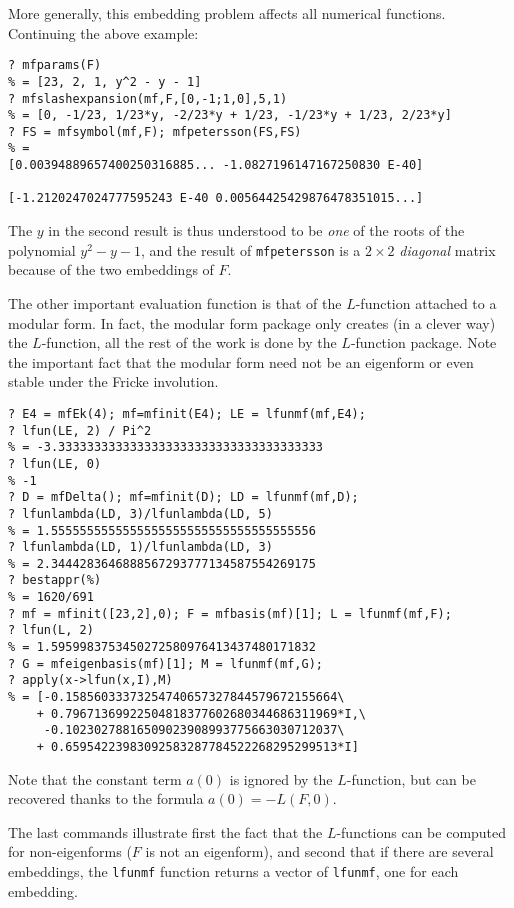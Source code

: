 \documentclass[11pt]{article}
\def\kbd#1{{\tt #1}}
\begin{document}
  More generally, this embedding problem affects all numerical functions.
  Continuing the above example:

\begin{verbatim}
? mfparams(F)
% = [23, 2, 1, y^2 - y - 1]
? mfslashexpansion(mf,F,[0,-1;1,0],5,1)
% = [0, -1/23, 1/23*y, -2/23*y + 1/23, -1/23*y + 1/23, 2/23*y]
? FS = mfsymbol(mf,F); mfpetersson(FS,FS)
% =
[0.00394889657400250316885... -1.0827196147167250830 E-40]

[-1.2120247024777595243 E-40 0.00564425429876478351015...]
\end{verbatim}

  The $y$ in the second result is thus understood to be \emph{one} of
  the roots of the polynomial $y^2-y-1$, and the result of \kbd{mfpetersson}
  is a $2\times 2$ \emph{diagonal} matrix because of the two embeddings of $F$.

  \smallskip

  The other important evaluation function is that of the $L$-function
  attached to a modular form. In fact, the modular form package only
  creates (in a clever way) the $L$-function, all the rest of the work
  is done by the $L$-function package. Note the important fact that
  the modular form need not be an eigenform or even stable under the
  Fricke involution.

\begin{verbatim}
? E4 = mfEk(4); mf=mfinit(E4); LE = lfunmf(mf,E4);
? lfun(LE, 2) / Pi^2
% = -3.3333333333333333333333333333333333333
? lfun(LE, 0)
% -1
? D = mfDelta(); mf=mfinit(D); LD = lfunmf(mf,D);
? lfunlambda(LD, 3)/lfunlambda(LD, 5)
% = 1.5555555555555555555555555555555555556
? lfunlambda(LD, 1)/lfunlambda(LD, 3)
% = 2.3444283646888567293777134587554269175
? bestappr(%)
% = 1620/691
? mf = mfinit([23,2],0); F = mfbasis(mf)[1]; L = lfunmf(mf,F);
? lfun(L, 2)
% = 1.5959983753450272580976413437480171832
? G = mfeigenbasis(mf)[1]; M = lfunmf(mf,G);
? apply(x->lfun(x,I),M)
% = [-0.15856033373254740657327844579672155664\
    + 0.79671369922504818377602680344686311969*I,\
     -0.10230278816509023908993775663030712037\
    + 0.65954223983092583287784522268295299513*I]
\end{verbatim}

  Note that the constant term $a(0)$ is ignored by the $L$-function, but
  can be recovered thanks to the formula $a(0)=-L(F,0)$.

  The last commands illustrate first the fact that the $L$-functions can be
  computed for non-eigenforms ($F$ is not an eigenform), and second that
  if there are several embeddings, the \kbd{lfunmf} function returns a
  vector of \kbd{lfunmf}, one for each embedding.
\end{document}

